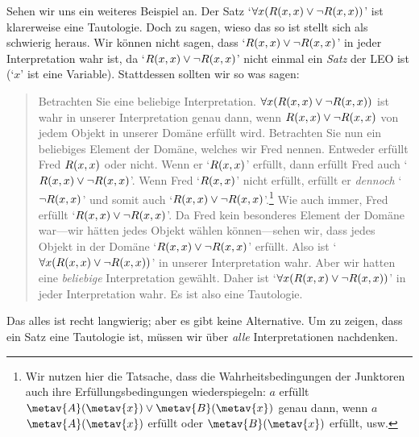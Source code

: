 Sehen wir uns ein weiteres Beispiel an. Der Satz `$\forall x(\mathord{R}(x,x)\vee\neg \mathord{R}(x,x))$' ist klarerweise eine Tautologie. Doch zu sagen, wieso das so ist stellt sich als schwierig heraus. Wir können nicht sagen, dass `$\mathord{R}(x,x) \vee\neg \mathord{R}(x,x)$' in jeder Interpretation wahr ist, da `$\mathord{R}(x,x) \vee\neg \mathord{R}(x,x)$' nicht einmal ein \emph{Satz} der LEO ist (`$x$' ist eine Variable). Stattdessen sollten wir so was sagen:
	\begin{quote}
		Betrachten Sie eine beliebige Interpretation. $\forall x(\mathord{R}(x,x)\vee \neg\mathord{R}(x,x))$ ist wahr in unserer Interpretation genau dann, wenn $\mathord{R}(x,x)\vee\neg\mathord{R}(x,x)$ von jedem Objekt in unserer Domäne erfüllt wird. Betrachten Sie nun ein beliebiges Element der Domäne, welches wir Fred nennen. Entweder erfüllt Fred $\mathord{R}(x,x)$ oder nicht. Wenn er `$\mathord{R}(x,x)$' erfüllt, dann erfüllt Fred auch `$\mathord{R}(x,x) \vee \neg \mathord{R}(x,x)$'. Wenn Fred `$\mathord{R}(x,x)$' nicht erfüllt, erfüllt er \emph{dennoch} `$\neg\mathord{R}(x,x)$' und somit auch `$\mathord{R}(x,x) \vee\neg \mathord{R}(x,x)$'.\footnote{Wir nutzen hier die Tatsache, dass die Wahrheitsbedingungen der Junktoren auch ihre Erfüllungsbedingungen wiederspiegeln: $a$ erfüllt $\metav{A}(\metav{x}) \lor \metav{B}(\metav{x})$ genau dann, wenn $a$ $\metav{A}(\metav{x})$ erfüllt oder $\metav{B}(\metav{x})$ erfüllt, usw.} Wie auch immer, Fred erfüllt `$\mathord{R}(x,x) \vee\neg \mathord{R}(x,x)$'. Da Fred kein besonderes Element der Domäne war---wir hätten jedes Objekt wählen können---sehen wir, dass jedes Objekt in der Domäne `$\mathord{R}(x,x) \vee\neg \mathord{R}(x,x)$' erfüllt. Also ist `$\forall x (\mathord{R}(x,x) \vee\neg \mathord{R}(x,x))$' in unserer Interpretation wahr. Aber wir hatten eine \emph{beliebige} Interpretation gewählt. Daher ist `$\forall x (\mathord{R}(x,x) \vee\neg \mathord{R}(x,x))$' in jeder Interpretation wahr. Es ist also eine Tautologie.
	\end{quote}
Das alles ist recht langwierig; aber es gibt keine Alternative. Um zu zeigen, dass ein Satz eine Tautologie ist, müssen wir über \emph{alle} Interpretationen nachdenken. 

